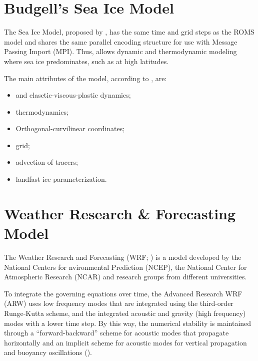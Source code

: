 
\section{Budgell's Sea Ice Model}\label{seaicesecao}
\bigskip

\noindent The Sea Ice Model, proposed by \textcite{Budgell2005}, has the same time and grid steps as the ROMS model and shares the same parallel encoding structure for use with Message Passing Import (MPI). 
Thus, allows dynamic and thermodynamic modeling where sea ice predominates, such as at high latitudes.
\bigskip

\noindent The main attributes of the model, according to \textcite{hedstrom2018}, are:
\bigskip
\begin{itemize}
    \item \textcite{Hunke1997} and \textcite{Hunke2001} elasctic-viscous-plastic dynamics;
    \item \textcite{Mellor1989} thermodynamics;
    \item Orthogonal-curvilinear coordinates;
    \item \textcite{Arakawa1977} grid;
    \item \textcite{Smolarkiewicz1990} advection of tracers;
    \item \textcite{Lemieux2015} landfast ice parameterization.
\end{itemize}
\bigskip



\section{Weather Research \& Forecasting Model}\label{secaowrf}
\bigskip

\noindent The Weather Research and Forecasting (WRF; \cite{Skamarock2008}) is a model developed by the National Centers for nvironmental Prediction (NCEP), the National Center for 
Atmospheric Research (NCAR) and research groups from different universities.
\bigskip

\noindent To integrate the governing equations over time, the Advanced Research WRF (ARW) uses low frequency modes that are integrated using the third-order Runge-Kutta scheme, 
and the integrated acoustic and gravity (high frequency) modes with a lower time step. By this way, the numerical stability is maintained through a “forward-backward” scheme for
acoustic modes that propagate horizontally and an implicit scheme for acoustic modes for vertical propagation and buoyancy oscillations (\cite{Skamarock2008}).
\bigskip

